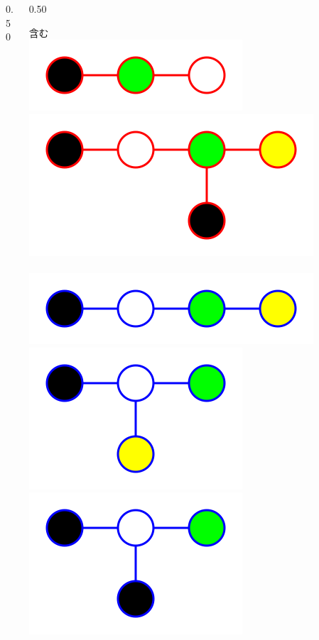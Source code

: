 \begin{tcolorbox}[title={\Large Gradient~Boosting~Decition~Tree}]
\begin{columns}[t]
\begin{column}{0.50\hsize}
\begin{tcolorbox}[colback=white]
			\end{tcolorbox}
		\end{column}
		\begin{column}{0.50\hsize}
			\begin{tcolorbox}[colback=white]
				含む \\
				\includegraphics[height=1\baselineskip]{img/graph/g01r.png} \hspace{30px}
				\includegraphics[height=2\baselineskip]{img/graph/g07r.png} \\
				\vspace{10px} \\
				\includegraphics[height=1\baselineskip]{img/graph/g08b.png}
				\includegraphics[height=2\baselineskip]{img/graph/g05b.png}
				\includegraphics[height=2\baselineskip]{img/graph/g06b.png}

\end{tcolorbox}
\end{column}
\end{columns}
\end{tcolorbox}

